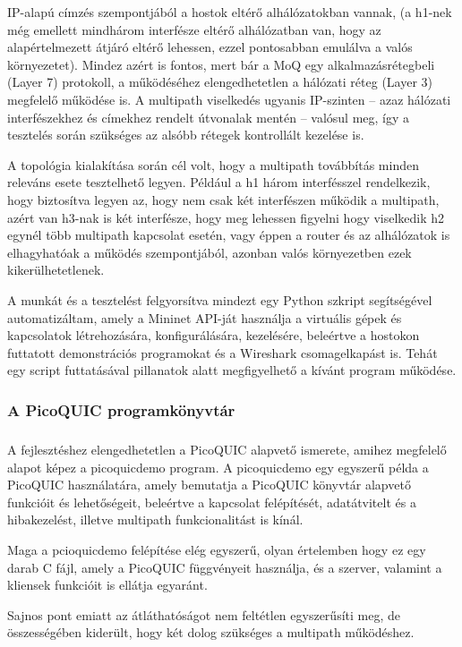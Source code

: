 \documentclass[a4paper,oneside]{article}
\begin{document}
IP-alapú címzés szempontjából a hostok eltérő alhálózatokban vannak, (a h1-nek még emellett 
mindhárom interfésze eltérő alhálózatban van, hogy az alapértelmezett átjáró eltérő lehessen, ezzel pontosabban emulálva a valós környezetet).
Mindez azért is fontos, mert bár a MoQ egy alkalmazásrétegbeli (Layer 7) protokoll, a 
működéséhez elengedhetetlen a hálózati réteg (Layer 3) megfelelő működése is. A multipath viselkedés 
ugyanis IP-szinten – azaz hálózati interfészekhez és címekhez rendelt útvonalak mentén – valósul meg, 
így a tesztelés során szükséges az alsóbb rétegek kontrollált kezelése is.

A topológia kialakítása során cél volt, hogy a multipath továbbítás minden releváns esete tesztelhető legyen.
Például a h1 három interfésszel rendelkezik, hogy biztosítva legyen az, hogy nem csak két interfészen működik a multipath, azért van h3-nak is két interfésze, 
hogy meg lehessen figyelni hogy viselkedik h2 egynél több multipath kapcsolat esetén, 
vagy éppen a router és az alhálózatok is elhagyhatóak a működés szempontjából, azonban valós környezetben ezek kikerülhetetlenek. 

A munkát és a tesztelést felgyorsítva mindezt egy Python szkript segítségével automatizáltam, 
amely a Mininet API-ját használja a virtuális gépek és kapcsolatok létrehozására, konfigurálására, kezelésére, beleértve
a hostokon futtatott demonstrációs programokat és a Wireshark csomagelkapást is.
Tehát egy script futtatásával pillanatok alatt megfigyelhető a kívánt program működése.

\subsubsection{A PicoQUIC programkönyvtár}

\subparagraph{}
A fejlesztéshez elengedhetetlen a PicoQUIC alapvető ismerete, amihez megfelelő alapot képez a picoquicdemo program.
A picoquicdemo egy egyszerű példa a PicoQUIC használatára, amely bemutatja a
PicoQUIC könyvtár alapvető funkcióit és lehetőségeit, beleértve a kapcsolat
felépítését, adatátvitelt és a hibakezelést, illetve multipath funkcionalitást is kínál. 

Maga a pcioquicdemo felépítése elég egyszerű, olyan értelemben hogy ez egy darab C fájl, amely a PicoQUIC függvényeit használja, 
és a szerver, valamint a kliensek funkcióit is ellátja egyaránt. 

Sajnos pont emiatt az átláthatóságot nem feltétlen egyszerűsíti meg, de összességében kiderült, hogy két dolog szükséges a multipath működéshez.
\end{document}
